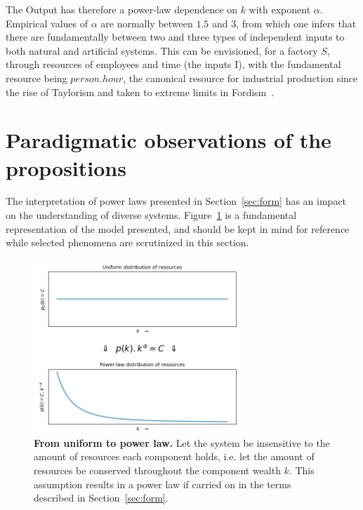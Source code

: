 \documentclass[10pt,letterpaper]{article}
\begin{document}
The Output has therefore a power-law dependence on $k$ with exponent $\alpha$. Empirical values of $\alpha$
are normally between $1.5$ and $3$, from which one infers that there are fundamentally between two and three types of independent inputs to both natural and artificial systems. This can be envisioned, for a factory $S$, through resources of employees and time (the inputs I), with the fundamental resource being $person . hour$, the canonical resource for industrial production since the rise of Taylorism and taken to extreme limits in Fordism~\cite{fordism}.

\section{Paradigmatic observations of the propositions}\label{sec:par}
The interpretation of power laws presented in Section~\ref{sec:form} has an impact on the
understanding of
diverse systems.
Figure~\ref{tfig} is a fundamental representation of the model presented,
and should be kept in mind for reference while
selected phenomena are scrutinized in this section.

\begin{figure}[!h]
  \includegraphics[width=0.7\textwidth]{../scripts/uni2power}
\caption{{\bf From uniform to power law.}
Let the system be insensitive to the amount of resources each component holds, i.e. let the amount of resources be conserved throughout the component wealth $k$.
  This assumption results in a power law if carried on in the terms described in Section~\ref{sec:form}.
  }
\label{tfig}
\end{figure}


 
\end{document}
